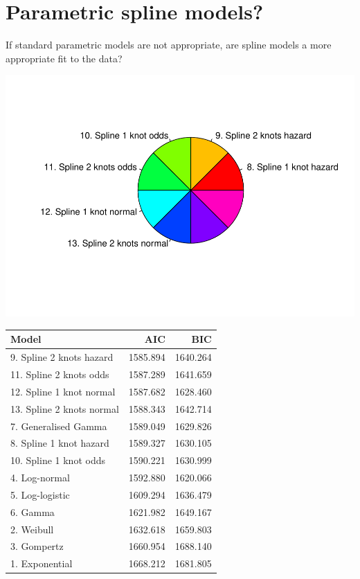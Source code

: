 \documentclass[]{article}
\begin{document}
\newpage

\section{Parametric spline models?}\label{parametric-spline-models}

If standard parametric models are not appropriate, are spline models a
more appropriate fit to the data?

\begin{flushleft}\includegraphics{images/spline-1} \end{flushleft}

\begin{table}[H]
\centering
\begin{tabular}{lrr}
\toprule
Model & AIC & BIC\\
\midrule
\rowcolor{gray!6}  9. Spline 2 knots hazard & 1585.894 & 1640.264\\
11. Spline 2 knots odds & 1587.289 & 1641.659\\
\rowcolor{gray!6}  12. Spline 1 knot normal & 1587.682 & 1628.460\\
13. Spline 2 knots normal & 1588.343 & 1642.714\\
\rowcolor{gray!6}  7. Generalised Gamma & 1589.049 & 1629.826\\
8. Spline 1 knot hazard & 1589.327 & 1630.105\\
\rowcolor{gray!6}  10. Spline 1 knot odds & 1590.221 & 1630.999\\
4. Log-normal & 1592.880 & 1620.066\\
\rowcolor{gray!6}  5. Log-logistic & 1609.294 & 1636.479\\
6. Gamma & 1621.982 & 1649.167\\
\rowcolor{gray!6}  2. Weibull & 1632.618 & 1659.803\\
3. Gompertz & 1660.954 & 1688.140\\
\rowcolor{gray!6}  1. Exponential & 1668.212 & 1681.805\\
\bottomrule
\end{tabular}
\end{table}
\end{document}
